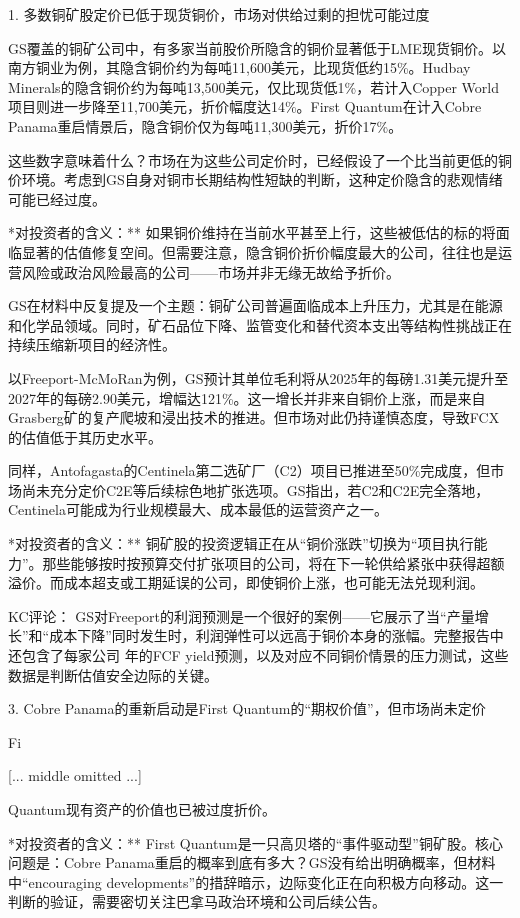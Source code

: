 \documentclass[11pt]{ctexart}
\begin{document}
1. 多数铜矿股定价已低于现货铜价，市场对供给过剩的担忧可能过度

GS覆盖的铜矿公司中，有多家当前股价所隐含的铜价显著低于LME现货铜价。以南方铜业为例，其隐含铜价约为每吨11,600美元，比现货低约15\%。Hudbay Minerals的隐含铜价约为每吨13,500美元，仅比现货低1\%，若计入Copper World项目则进一步降至11,700美元，折价幅度达14\%。First Quantum在计入Cobre Panama重启情景后，隐含铜价仅为每吨11,300美元，折价17\%。

这些数字意味着什么？市场在为这些公司定价时，已经假设了一个比当前更低的铜价环境。考虑到GS自身对铜市长期结构性短缺的判断，这种定价隐含的悲观情绪可能已经过度。

*对投资者的含义：** 如果铜价维持在当前水平甚至上行，这些被低估的标的将面临显著的估值修复空间。但需要注意，隐含铜价折价幅度最大的公司，往往也是运营风险或政治风险最高的公司——市场并非无缘无故给予折价。

GS在材料中反复提及一个主题：铜矿公司普遍面临成本上升压力，尤其是在能源和化学品领域。同时，矿石品位下降、监管变化和替代资本支出等结构性挑战正在持续压缩新项目的经济性。

以Freeport-McMoRan为例，GS预计其单位毛利将从2025年的每磅1.31美元提升至2027年的每磅2.90美元，增幅达121\%。这一增长并非来自铜价上涨，而是来自Grasberg矿的复产爬坡和浸出技术的推进。但市场对此仍持谨慎态度，导致FCX的估值低于其历史水平。

同样，Antofagasta的Centinela第二选矿厂（C2）项目已推进至50\%完成度，但市场尚未充分定价C2E等后续棕色地扩张选项。GS指出，若C2和C2E完全落地，Centinela可能成为行业规模最大、成本最低的运营资产之一。

*对投资者的含义：** 铜矿股的投资逻辑正在从“铜价涨跌”切换为“项目执行能力”。那些能够按时按预算交付扩张项目的公司，将在下一轮供给紧张中获得超额溢价。而成本超支或工期延误的公司，即使铜价上涨，也可能无法兑现利润。

KC评论： GS对Freeport的利润预测是一个很好的案例——它展示了当“产量增长”和“成本下降”同时发生时，利润弹性可以远高于铜价本身的涨幅。完整报告中还包含了每家公司 年的FCF yield预测，以及对应不同铜价情景的压力测试，这些数据是判断估值安全边际的关键。

3. Cobre Panama的重新启动是First Quantum的“期权价值”，但市场尚未定价

Fi

[... middle omitted ...]

Quantum现有资产的价值也已被过度折价。

*对投资者的含义：** First Quantum是一只高贝塔的“事件驱动型”铜矿股。核心问题是：Cobre Panama重启的概率到底有多大？GS没有给出明确概率，但材料中“encouraging developments”的措辞暗示，边际变化正在向积极方向移动。这一判断的验证，需要密切关注巴拿马政治环境和公司后续公告。
\end{document}
